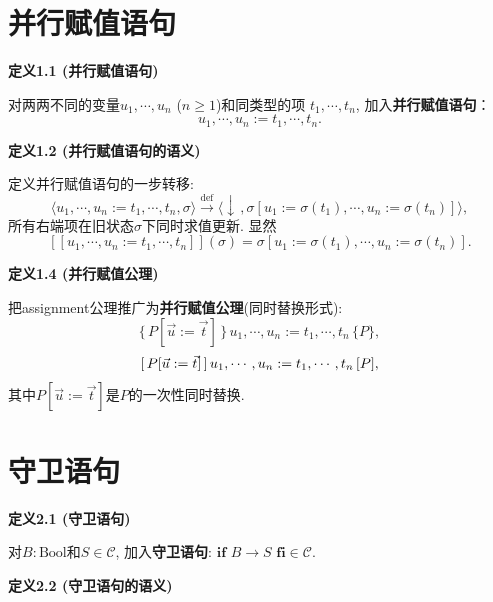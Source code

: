 \documentclass[UTF8]{ctexart}
\begin{document}
\setlength{\abovedisplayskip}{1pt}
\setlength{\belowdisplayskip}{1pt}

\section{并行赋值语句}

\hypertarget{sec:定义1.1}{}
\noindent\textbf{定义1.1 (并行赋值语句)}

对两两不同的变量$u_1,\cdots,u_n$ ($n\geqslant1$)和同类型的项
$t_1,\cdots,t_n$, 加入\textbf{并行赋值语句}：
\[
    u_1,\cdots,u_n:=t_1,\cdots,t_n.
\]

\vspace{10pt}

\hypertarget{sec:定义1.2}{}
\noindent\textbf{定义1.2 (并行赋值语句的语义)}

定义并行赋值语句的一步转移:
\[
    \langle u_1,\cdots,u_n:=t_1,\cdots,t_n,\sigma\rangle
    \overset{\mathrm{def}}{\to}
    \langle\downarrow\,,\sigma[u_1:=\sigma(t_1),\cdots,u_n:=\sigma(t_n)]\rangle,
\]
所有右端项在旧状态$\sigma$下同时求值更新. 显然
\[
    [\![u_1,\cdots,u_n:=t_1,\cdots,t_n]\!](\sigma)
    =\sigma[u_1:=\sigma(t_1),\cdots,u_n:=\sigma(t_n)].
\]

\vspace{10pt}

\hypertarget{sec:定义1.4}{}
\noindent\textbf{定义1.4 (并行赋值公理)}

把assignment公理推广为\textbf{并行赋值公理}(同时替换形式):
\[
    \{\,P[\vec{u}:=\vec{t}]\,\}\,u_1,\cdots,u_n:=t_1,\cdots,t_n\,\{P\},
\]
\[
    [\,P[\vec{u}:=\vec{t}]\,]\,u_1,\cdots,u_n:=t_1,\cdots,t_n\,[P],\\[-3pt]
\]
其中$P[\vec{u}:=\vec{t}]$是$P$的一次性同时替换.





\vspace{30pt}

\section{守卫语句}

\hypertarget{sec:定义2.1}{}
\noindent\textbf{定义2.1 (守卫语句)}

对$B:\mathrm{Bool}$和$S\in\mathcal{C}$, 加入\textbf{守卫语句}:
$\mathbf{if}\,\,B\to S\,\,\mathbf{fi}\in\mathcal{C}$.

\vspace{10pt}

\hypertarget{sec:定义2.2}{}
\noindent\textbf{定义2.2 (守卫语句的语义)}
\end{document}
